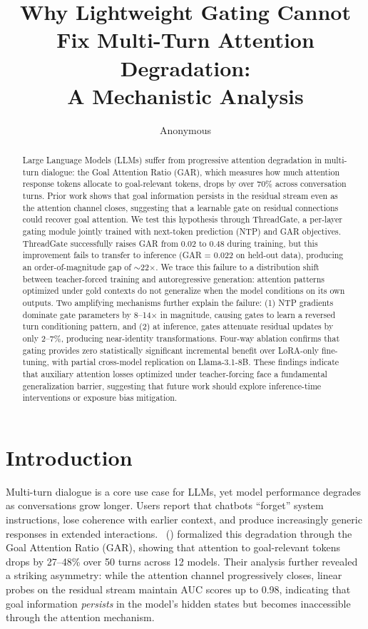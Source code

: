 \documentclass[11pt,a4paper]{article}
\title{Why Lightweight Gating Cannot Fix Multi-Turn Attention Degradation:\\A Mechanistic Analysis}
\author{Anonymous}
\newcommand{\citet}[1]{\citeauthor{#1}~(\citeyear{#1})}
\begin{document}
\maketitle

\begin{abstract}
Large Language Models (LLMs) suffer from progressive attention degradation in multi-turn dialogue: the Goal Attention Ratio (GAR), which measures how much attention response tokens allocate to goal-relevant tokens, drops by over 70\% across conversation turns. Prior work shows that goal information persists in the residual stream even as the attention channel closes, suggesting that a learnable gate on residual connections could recover goal attention. We test this hypothesis through ThreadGate, a per-layer gating module jointly trained with next-token prediction (NTP) and GAR objectives. ThreadGate successfully raises GAR from 0.02 to 0.48 during training, but this improvement fails to transfer to inference (GAR = 0.022 on held-out data), producing an order-of-magnitude gap of $\sim$22$\times$. We trace this failure to a distribution shift between teacher-forced training and autoregressive generation: attention patterns optimized under gold contexts do not generalize when the model conditions on its own outputs. Two amplifying mechanisms further explain the failure: (1) NTP gradients dominate gate parameters by 8--14$\times$ in magnitude, causing gates to learn a reversed turn conditioning pattern, and (2) at inference, gates attenuate residual updates by only 2--7\%, producing near-identity transformations. Four-way ablation confirms that gating provides zero statistically significant incremental benefit over LoRA-only fine-tuning, with partial cross-model replication on Llama-3.1-8B. These findings indicate that auxiliary attention losses optimized under teacher-forcing face a fundamental generalization barrier, suggesting that future work should explore inference-time interventions or exposure bias mitigation.
\end{abstract}

\section{Introduction}

Multi-turn dialogue is a core use case for LLMs, yet model performance degrades as conversations grow longer. Users report that chatbots ``forget'' system instructions, lose coherence with earlier context, and produce increasingly generic responses in extended interactions. \citet{dongre2026} formalized this degradation through the Goal Attention Ratio (GAR), showing that attention to goal-relevant tokens drops by 27--48\% over 50 turns across 12 models. Their analysis further revealed a striking asymmetry: while the attention channel progressively closes, linear probes on the residual stream maintain AUC scores up to 0.98, indicating that goal information \emph{persists} in the model's hidden states but becomes inaccessible through the attention mechanism.
\end{document}
